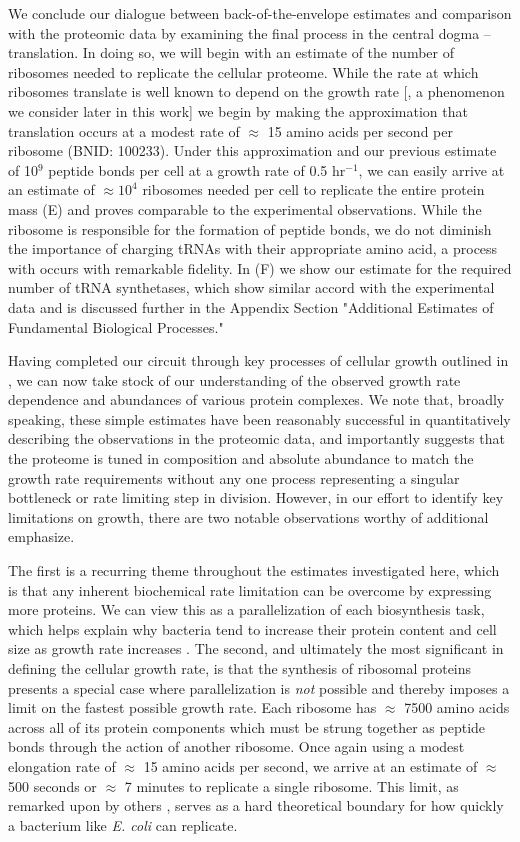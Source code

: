 We conclude our dialogue between back-of-the-envelope estimates and comparison
with the proteomic data by examining the final process in the central dogma --
translation. In doing so, we will begin with an estimate of the number of
ribosomes needed to replicate the cellular proteome. While the rate at which
ribosomes translate is well known to depend on the growth rate [\cite{dai2018},
a phenomenon we consider later in this work] we begin by making the
approximation that translation occurs at a modest rate of $\approx$ 15 amino
acids per second per ribosome (BNID: 100233). Under this approximation and our
previous estimate of 10$^{9}$ peptide bonds per cell at a growth rate of 0.5
hr$^{-1}$, we can easily arrive at an estimate of $\approx 10^4$ ribosomes
needed per cell to replicate the entire protein mass (E) and
proves comparable to the experimental observations. While the ribosome is
responsible for the formation of peptide bonds, we do not diminish the
importance of charging tRNAs with their appropriate amino acid, a process with
occurs with remarkable fidelity. In (F) we show our estimate
for the required number of tRNA synthetases, which show similar accord with the
experimental data and is discussed further in the Appendix Section "Additional
Estimates of Fundamental Biological Processes."

Having completed our circuit through key processes of cellular growth outlined
in , we can now take stock of our understanding of the observed
growth rate dependence and abundances of various protein complexes. We note
that, broadly speaking, these simple estimates have been reasonably successful
in quantitatively describing the observations in the proteomic data, and
importantly suggests that the proteome is tuned in composition and absolute
abundance to match the growth rate requirements without any one process
representing a singular bottleneck or rate limiting step in division. However,
in our effort to identify key limitations on growth, there are two notable
observations worthy of additional emphasize.

The first is a recurring theme throughout the estimates investigated here, which
is that any inherent biochemical rate limitation can be overcome by expressing
more proteins. We can view this as a parallelization of each biosynthesis task,
which helps explain why bacteria tend to increase their protein content and
cell size as growth rate increases \citep{ojkic2019}. The second, and
ultimately the most significant in defining the cellular growth rate, is that
the synthesis of ribosomal proteins presents a special case where
parallelization is \textit{not} possible and thereby imposes a limit on the
fastest possible growth rate. Each ribosome has $\approx$ 7500 amino acids
across all of its protein components which must be strung together as peptide
bonds through the action of another ribosome. Once again using a modest
elongation rate of $\approx$ 15 amino acids per second, we arrive at an estimate of
$\approx$ 500 seconds or $\approx$ 7 minutes to replicate a single ribosome.
This limit, as remarked upon by others \citep{dill2011}, serves as a hard
theoretical boundary for how quickly a bacterium like \textit{E. coli} can
replicate.

